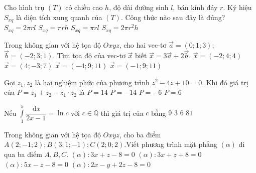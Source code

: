 \begin{ex}%
	Cho hình trụ $(T)$ có chiều cao $h$, độ dài đường sinh $l$, bán kính đáy $r$. Ký hiệu $S_{xq}$ là diện tích xung quanh của $(T)$. Công thức nào sau đây là đúng?
	\choice
	{\True $S_{xq}=2\pi rl$}
	{$S_{xq}=\pi rh$}
	{$S_{xq}=\pi rl$}
	{$S_{xq}=2\pi r^2h$}
	\loigiai{
		
	}
\end{ex}

\begin{ex}%
	Trong không gian với hệ tọa độ $Oxyz$, cho hai vec-tơ $\vec{a}=(0;1;3)$; $\vec{b}=(-2;3;1)$. Tìm tọa độ của vec-tơ $\vec{x}$  biết $\vec{x}=3\vec{a}+2\vec{b}$.
	\choice
	{$\vec{x}=(-2;4;4)$}
	{$\vec{x}=(4;-3;7)$}
	{\True $\vec{x}=(-4;9;11)$}
	{$\vec{x}=(-1;9;11)$}
\end{ex}

\begin{ex}%
	Gọi $z_1, z_2$  là hai nghiệm phức của phương trình $z^2-4z+10=0$. Khi đó giá trị của $P=z_1+z_2-z_1 \cdot z_2$ là
	\choice
	{$P=14$}
	{$P=-14$}
	{\True $P=-6$}
	{$P=6$}
\end{ex}

\begin{ex}%
	Nếu $\displaystyle\int\limits_1^5 \dfrac{\mathrm{\,d}x}{2x-1}=\ln c$ với $c \in \mathbb{Q}$ thì giá trị của $c$ bằng
	\choice
	{$9$}
	{\True $3$}
	{$6$}
	{$81$}
\end{ex}

\begin{ex}%
	Trong không gian với hệ tọa độ $Oxyz$, cho ba điểm $A(2; -1;2); B(3;1; -1); C(2;0;2)$.Viết phương trình mặt phẳng $(\alpha)$ đi qua ba điểm $A, B, C$.
	\choice
	{\True $(\alpha)\colon 3x+z-8=0$}
	{$(\alpha)\colon 3x+z+8=0$}
	{$(\alpha)\colon 5x-z-8=0$}
	{$(\alpha)\colon 2x-y+2z-8=0$}
\end{ex}

